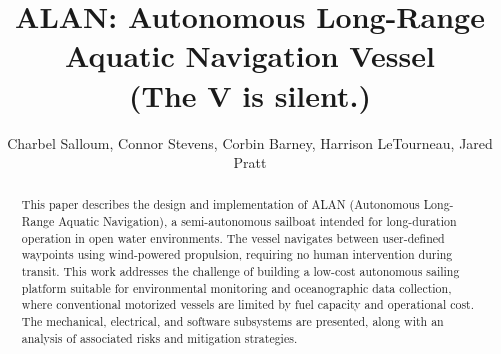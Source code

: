 \documentclass[11pt, journal]{IEEEtran}
\begin{document}

    \title{
        ALAN: Autonomous Long-Range Aquatic Navigation Vessel \\ 
        {\normalsize (The V is silent.)}
    }
    \author{
        Charbel Salloum, 
        Connor Stevens, 
        Corbin Barney, 
        Harrison LeTourneau, 
        Jared Pratt
    }

    \maketitle


    \begin{abstract}
    This paper describes the design and implementation of ALAN (Autonomous Long-Range Aquatic Navigation), a semi-autonomous sailboat intended for long-duration operation in open water environments. The vessel navigates between user-defined waypoints using wind-powered propulsion, requiring no human intervention during transit. This work addresses the challenge of building a low-cost autonomous sailing platform suitable for environmental monitoring and oceanographic data collection, where conventional motorized vessels are limited by fuel capacity and operational cost. The mechanical, electrical, and software subsystems are presented, along with an analysis of associated risks and mitigation strategies.
    \end{abstract}


    
    
    
    
    
    
    


    \appendices
    
    
    
    


    
    


    
    
    
\end{document}
